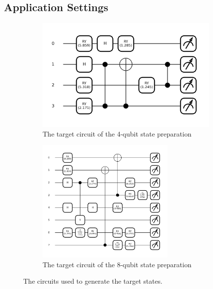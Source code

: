 \documentclass{article} %
\begin{document}
\subsection{Application Settings}
\label{application_setting}
\begin{figure}[ht]
\begin{center}
    \begin{subfigure}[b]{0.475\textwidth}
    \centering
    \includegraphics[width=\textwidth]{images/4-qubits-fidelity_target.png} %
    \caption{The target circuit of the 4-qubit state preparation} 
    \end{subfigure}
    \hspace{0.5cm}
    \begin{subfigure}[b]{0.475\textwidth}
    \centering
    \includegraphics[width=0.75\textwidth, height=0.6\textwidth]{images/8-qubits-fidelity_target.png}
    \caption{The target circuit of the 8-qubit state preparation} 
    \end{subfigure}
    \caption{The circuits used to generate the target states.}
    \label{fidelity_target}  
\end{center}
\end{figure}
\end{document}
